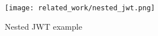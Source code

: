 \begin{figure}[H]
  \centering
  \texttt{[image: related\_work/nested\_jwt.png]}
  \caption{Nested JWT example}
  \label{fig:nested_jwt}
\end{figure}

 



% 
% 
% 
% 
% 

